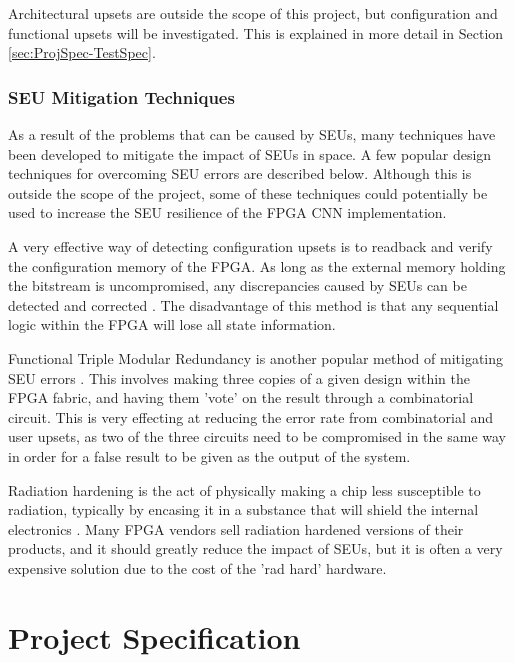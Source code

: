 \documentclass[12pt]{article}
\begin{document}
Architectural upsets are outside the scope of this project, but configuration and functional upsets will be investigated. This is explained in more detail in Section \ref{sec:ProjSpec-TestSpec}.

\subsubsection{SEU Mitigation Techniques}
\label{sec:Background-FPGAsAndSpaceApplications-Mitigation}


As a result of the problems that can be caused by SEUs, many techniques have been developed to mitigate the impact of SEUs in space. A few popular design techniques for overcoming SEU errors are described below. Although this is outside the scope of the project, some of these techniques could potentially be used to increase the SEU resilience of the FPGA CNN implementation.

A very effective way of detecting configuration upsets is to readback and verify the configuration memory of the FPGA. As long as the external memory holding the bitstream is uncompromised, any discrepancies caused by SEUs can be detected and corrected \cite{SuitabilityGaisler}. The disadvantage of this method is that any sequential logic within the FPGA will lose all state information.

Functional Triple Modular Redundancy is another popular method of mitigating SEU errors \cite{FTripleMR}. This involves making three copies of a given design within the FPGA fabric, and having them 'vote' on the result through a combinatorial circuit. This is very effecting at reducing the error rate from combinatorial and user upsets, as two of the three circuits need to be compromised in the same way in order for a false result to be given as the output of the system.

Radiation hardening is the act of physically making a chip less susceptible to radiation, typically by encasing it in a substance that will shield the internal electronics \cite{RadHardFpga}. Many FPGA vendors sell radiation hardened versions of their products, and it should greatly reduce the impact of SEUs, but it is often a very expensive solution due to the cost of the 'rad hard' hardware.

\newpage

\section{Project Specification}
\label{sec:ProjSpec}
\end{document}
